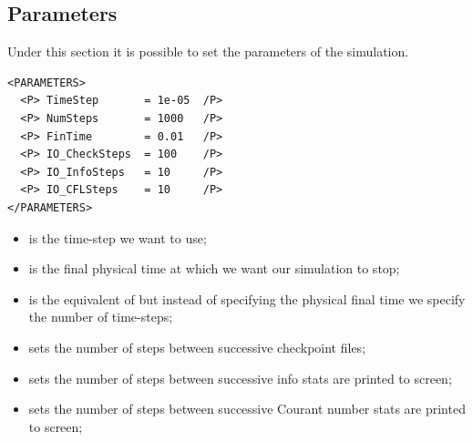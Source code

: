\subsection*{Parameters}
Under this section it is possible to set the parameters of the simulation.
\begin{lstlisting}[style=XmlStyle]
<PARAMETERS>
  <P> TimeStep       = 1e-05  /P>
  <P> NumSteps       = 1000   /P>
  <P> FinTime        = 0.01   /P>
  <P> IO_CheckSteps  = 100    /P>
  <P> IO_InfoSteps   = 10     /P>
  <P> IO_CFLSteps    = 10     /P>
</PARAMETERS>
\end{lstlisting}
\begin{itemize}
    \item {} is the time-step we want to use;
    \item {} is the final physical time at which we want our simulation to stop;
    \item {} is the equivalent of  but instead of specifying the physical final time we specify the number of time-steps;
    \item {} sets the number of steps between successive checkpoint files;
    \item {} sets the number of steps between successive info stats are printed to screen;
    \item {} sets the number of steps between successive Courant number stats are printed to screen;
\end{itemize}

